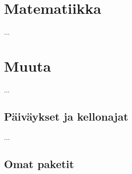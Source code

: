 \documentclass{book}
\begin{document}
\cleardoublepage
\pagestyle{plain}

\tableofcontents

\cleardoublepage







\chapter{Matematiikka}
\label{luku:matematiikka}


...

\chapter{Muuta}

...

\section{Päiväykset ja kellonajat}

...

\section{Omat paketit}
\end{document}
